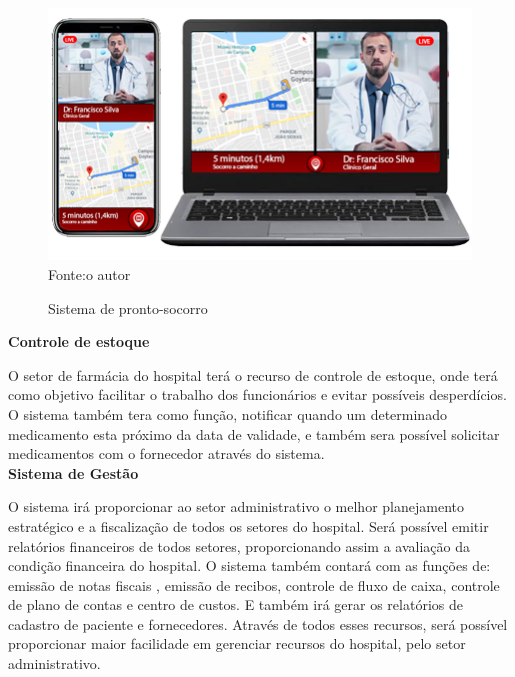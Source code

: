 \begin{figure}[H]
              \begin{center}
                  \caption{Sistema de pronto-socorro} \label{afp}
                  \includegraphics[width=15cm]{Pictures/smartENotoe.png} \\
                    {\tiny \sf Fonte:o autor }

              \end{center}
             \end{figure}


\textbf{Controle de estoque} 

O setor de farmácia do hospital terá o recurso de controle de estoque, onde terá como objetivo facilitar o trabalho dos funcionários e evitar possíveis desperdícios. O sistema também tera como função, notificar quando um determinado medicamento esta próximo da data de validade, e também sera possível solicitar medicamentos com o fornecedor através do sistema. \\

\textbf{Sistema de Gestão} 

O sistema irá proporcionar ao setor administrativo o melhor planejamento estratégico e a fiscalização de todos os setores do hospital. Será possível emitir relatórios financeiros de todos setores, proporcionando assim a avaliação da condição financeira do hospital. O sistema também contará com as funções de: emissão de notas fiscais , emissão de recibos, controle de fluxo de caixa, controle de plano de contas e centro de custos. E também irá gerar os relatórios de cadastro de paciente e fornecedores. Através de todos esses recursos, será possível proporcionar maior facilidade em gerenciar recursos do hospital, pelo setor administrativo. \\


